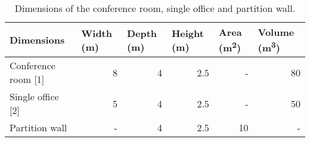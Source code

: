 \begin{table}[htbp]
	\caption{Dimensions of the conference room, single office and partition wall.}
	\label{tbl:room_dims}
	\centering
	\begin{tabular}{@{}lrrrrr@{}}
		\toprule
		Dimensions & \multicolumn{1}{l}{Width (m)} & \multicolumn{1}{l}{Depth (m)} & \multicolumn{1}{l}{Height (m)} & \multicolumn{1}{l}{Area (m\textsuperscript{2})} & \multicolumn{1}{l}{Volume (m\textsuperscript{3})} \\ \midrule
		Conference room [1] & 8 & 4 & 2.5 & - & 80 \\
		Single office [2] & 5 & 4 & 2.5 & - & 50 \\
		Partition wall & - & 4 & 2.5 & 10 & - \\ \bottomrule
	\end{tabular}
\end{table}